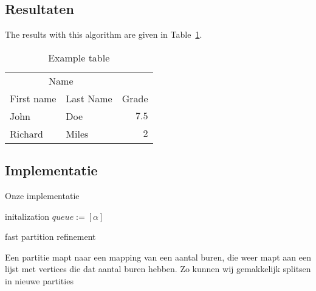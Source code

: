 \documentclass[twoside]{article}
\begin{document}
\begin{multicols}{2}
\section{Resultaten}

The results with this algorithm are given in Table~\ref{table:example}.
\begin{table}[H]
\caption{Example table}\label{table:example}
\centering
\begin{tabular}{llr}
\toprule
\multicolumn{2}{c}{Name} \\
\cmidrule(r){1-2}
First name & Last Name & Grade \\
\midrule
John & Doe & $7.5$ \\
Richard & Miles & $2$ \\
\bottomrule
\end{tabular}
\end{table}


\lipsum[5] %

\subsection{Implementatie}
Onze implementatie 
\begin{algorithm}[H]
initalization \;
 $queue := [\alpha]$\;

 \caption{fast partition refinement}
\end{algorithm}
\pagebreak

\begin{algorithm}[H]
Een partitie mapt naar een mapping van een aantal buren, die weer mapt aan een lijst met vertices die dat aantal buren hebben. Zo kunnen wij gemakkelijk splitsen in nieuwe partities \;



\end{algorithm}
\end{multicols}
\end{document}
